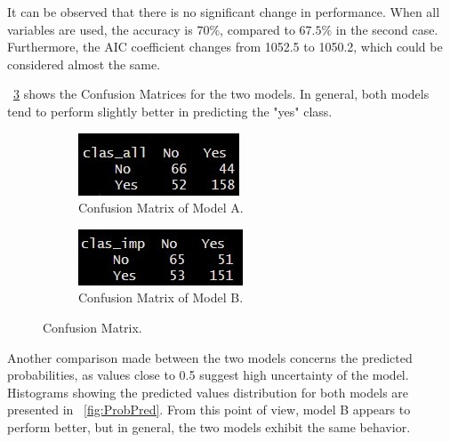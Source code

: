 It can be observed that there is no significant change in performance. When all variables are used, the accuracy is $70\%$, compared to $67.5\%$ in the second case. Furthermore, the AIC coefficient changes from 1052.5 to 1050.2, which could be considered almost the same. 

\Fig~\ref{fig:CM} shows the Confusion Matrices for the two models. In general, both models tend to perform slightly better in predicting the "yes" class.

\begin{figure}[h]
	\begin{subfigure}{.6\textwidth}
		\centering
		\includegraphics[width=0.7\linewidth]{ImageFiles/Classification/LogReg/log_reg_tt_all_pred_table}
		\caption{Confusion Matrix of Model A.}
		\label{fig:CMA}
	\end{subfigure}
	\begin{subfigure}{.6\textwidth}
		\centering
		\includegraphics[width=0.7\linewidth]{ImageFiles/Classification/LogReg/log_reg_tt_imp_pred_table}
		\caption{Confusion Matrix of Model B.}
		\label{fig:CMB}
	\end{subfigure}
	\caption{Confusion Matrix.}
	\label{fig:CM}
\end{figure}

Another comparison made between the two models concerns the predicted probabilities, as values close to 0.5 suggest high uncertainty of the model. Histograms showing the predicted values distribution for both models are presented in \Fig~\ref{fig:ProbPred}. From this point of view, model B appears to perform better, but in general, the two models exhibit the same behavior.

